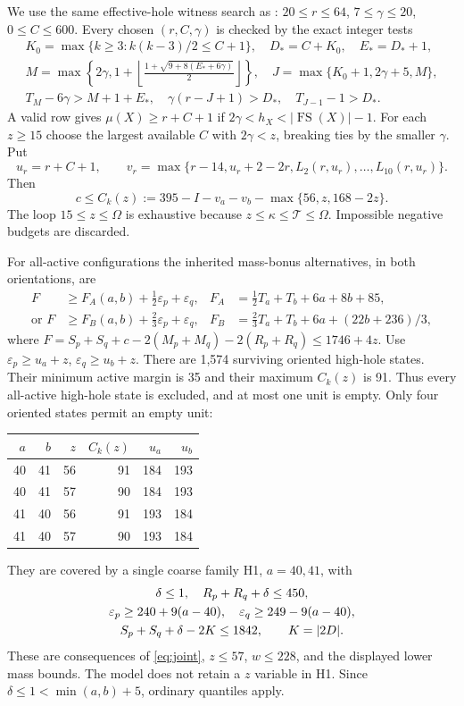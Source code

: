 \documentclass[11pt,a4paper]{article}
\newcommand{\FS}{\operatorname{FS}}
\newcommand{\T}{\mathcal T}
\begin{document}
We use the same effective-hole witness search as \cite{base98}:
$20\le r\le64$, $7\le\gamma\le20$, $0\le C\le600$.
Every chosen $(r,C,\gamma)$ is checked by the exact integer tests
\begin{gather*}
 K_0=\max\{k\ge3:k(k-3)/2\le C+1\},\quad D_*=C+K_0,\quad E_*=D_*+1,\\
 M=\max\left\{2\gamma,1+\left\lfloor
 \frac{1+\sqrt{9+8(E_*+6\gamma)}}2\right\rfloor\right\},\quad
 J=\max\{K_0+1,2\gamma+5,M\},\\
 T_M-6\gamma>M+1+E_*,\quad
 \gamma(r-J+1)>D_*,\quad T_{J-1}-1>D_*.
\end{gather*}
A valid row gives $\mu(X)\ge r+C+1$ if
$2\gamma<h_X<|\FS(X)|-1$. For each $z\ge15$ choose the largest
available $C$ with $2\gamma<z$, breaking ties by the smaller $\gamma$.
Put
\[
 u_r=r+C+1,\qquad
 v_r=\max\{r-14,u_r+2-2r,L_2(r,u_r),\ldots,L_{10}(r,u_r)\}.
\]
Then
\begin{equation}\label{eq:highbudget}
 c\le C_k(z):=395-I-v_a-v_b-\max\{56,z,168-2z\}.
\end{equation}
The loop $15\le z\le\Omega$ is exhaustive because
$z\le\kappa\le\T\le\Omega$. Impossible negative budgets are discarded.

For all-active configurations the inherited mass-bonus alternatives,
in both orientations, are
\begin{align*}
 F&\ge F_A(a,b)+\tfrac12\varepsilon_p+\varepsilon_q,
 &F_A&=\tfrac12T_a+T_b+6a+8b+85,\\
 \text{or }F&\ge F_B(a,b)+\tfrac23\varepsilon_p+\varepsilon_q,
 &F_B&=\tfrac23T_a+T_b+6a+(22b+236)/3,
\end{align*}
where $F=S_p+S_q+c-2(M_p+M_q)-2(R_p+R_q)\le1746+4z$.
Use $\varepsilon_p\ge u_a+z$, $\varepsilon_q\ge u_b+z$.
There are 1,574 surviving oriented high-hole states. Their minimum active
margin is 35 and their maximum $C_k(z)$ is 91. Thus every all-active
high-hole state is excluded, and at most one unit is empty.
Only four oriented states permit an empty unit:
\begin{center}
\begin{tabular}{rrrrrr}
\toprule
$a$&$b$&$z$&$C_k(z)$&$u_a$&$u_b$\\
\midrule
40&41&56&91&184&193\\
40&41&57&90&184&193\\
41&40&56&91&193&184\\
41&40&57&90&193&184\\
\bottomrule
\end{tabular}
\end{center}
They are covered by a single coarse family H1, $a=40,41$, with
\begin{gather}
 \delta\le1,\quad R_p+R_q+\delta\le450,\notag\\
 \varepsilon_p\ge240+9(a-40),\quad
 \varepsilon_q\ge249-9(a-40),\notag\\
 S_p+S_q+\delta-2K\le1842,\qquad K=|2D|.\label{eq:H}
\end{gather}
These are consequences of \eqref{eq:joint}, $z\le57$, $w\le228$,
and the displayed lower mass bounds. The model does not retain a $z$
variable in H1. Since $\delta\le1<\min(a,b)+5$, ordinary quantiles apply.
\end{document}
